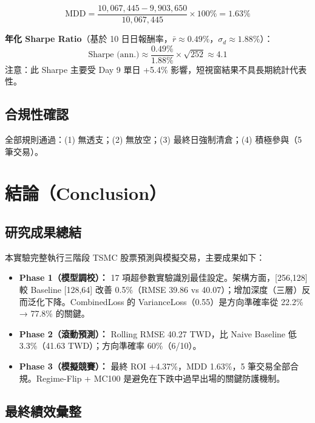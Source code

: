 \documentclass[12pt,a4paper]{article}
\begin{document}
\begin{equation}
\text{MDD} = \frac{10{,}067{,}445 - 9{,}903{,}650}{10{,}067{,}445} \times 100\% = 1.63\%
\end{equation}

\textbf{年化 Sharpe Ratio}（基於 10 日日報酬率，$\bar{r} \approx 0.49\%$，$\sigma_d \approx 1.88\%$）：
\begin{equation}
\text{Sharpe (ann.)} \approx \frac{0.49\%}{1.88\%} \times \sqrt{252} \approx 4.1
\end{equation}
注意：此 Sharpe 主要受 Day 9 單日 +5.4\% 影響，短視窗結果不具長期統計代表性。

\subsection{合規性確認}

全部規則通過：(1) 無透支；(2) 無放空；(3) 最終日強制清倉；(4) 積極參與（5 筆交易）。

\section{結論（Conclusion）}

\subsection{研究成果總結}

本實驗完整執行三階段 TSMC 股票預測與模擬交易，主要成果如下：

\begin{itemize}
  \item \textbf{Phase 1（模型調校）：} 17 項超參數實驗識別最佳設定。架構方面，[256,128] 較 Baseline [128,64] 改善 0.5\%（RMSE 39.86 vs 40.07）；增加深度（三層）反而泛化下降。CombinedLoss 的 VarianceLoss（0.55）是方向準確率從 22.2\% → 77.8\% 的關鍵。
  \item \textbf{Phase 2（滾動預測）：} Rolling RMSE 40.27 TWD，比 Naive Baseline 低 3.3\%（41.63 TWD）；方向準確率 60\%（6/10）。
  \item \textbf{Phase 3（模擬競賽）：} 最終 ROI +4.37\%，MDD 1.63\%，5 筆交易全部合規。Regime-Flip + MC100 是避免在下跌中過早出場的關鍵防護機制。
\end{itemize}

\subsection{最終績效彙整}
\end{document}
